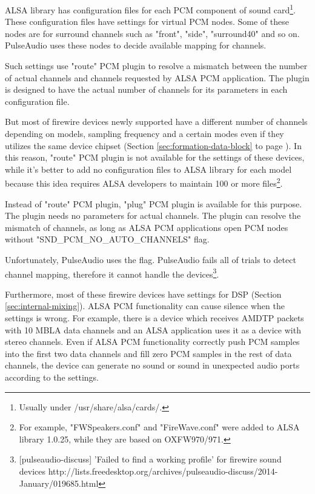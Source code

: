 \documentclass[onecolumn]{jarticle}
\begin{document}
ALSA library has configuration files for each PCM component of sound card\footnote{Usually under /usr/share/alsa/cards/.}. These configuration files have settings for virtual PCM nodes. Some of these nodes are for surround channels such as "front", "side", "surround40" and so on. PulseAudio uses these nodes to decide available mapping for channels.

Such settings use "route" PCM plugin to resolve a mismatch between the number of actual channels and channels requested by ALSA PCM application. The plugin is designed to have the actual number of channels for its parameters in each configuration file.

But most of firewire devices newly supported have a different number of channels depending on models, sampling frequency and a certain modes even if they utilizes the same device chipset (Section \ref{sec:formation-data-block} to page \pageref{sec:formation-data-block}). In this reason, "route" PCM plugin is not available for the settings of these devices, while it's better to add no configuration files to ALSA library for each model because this idea requires ALSA developers to maintain 100 or more files\footnote{For example, "FWSpeakers.conf" and "FireWave.conf" were added to ALSA library 1.0.25, while they are based on OXFW970/971.}.

Instead of "route" PCM plugin, "plug" PCM plugin is available for this purpose. The plugin needs no parameters for actual channels. The plugin can resolve the mismatch of channels, as long as ALSA PCM applications open PCM nodes without "SND\_PCM\_NO\_AUTO\_CHANNELS" flag.

Unfortunately, PulseAudio uses the flag. PulseAudio fails all of trials to detect channel mapping, therefore it cannot handle the devices\footnote{[pulseaudio-discuss] 'Failed to find a working profile' for firewire sound devices http://lists.freedesktop.org/archives/pulseaudio-discuss/2014-January/019685.html}.

Furthermore, most of these firewire devices have settings for DSP (Section \ref{sec:internal-mixing}). ALSA PCM functionality can cause silence when the settings is wrong. For example, there is a device which receives AMDTP packets with 10 MBLA data channels and an ALSA application uses it as a device with stereo channels. Even if ALSA PCM functionality correctly push PCM samples into the first two data channels and fill zero PCM samples in the rest of data channels, the device can generate no sound or sound in unexpected audio ports according to the settings.
\end{document}
